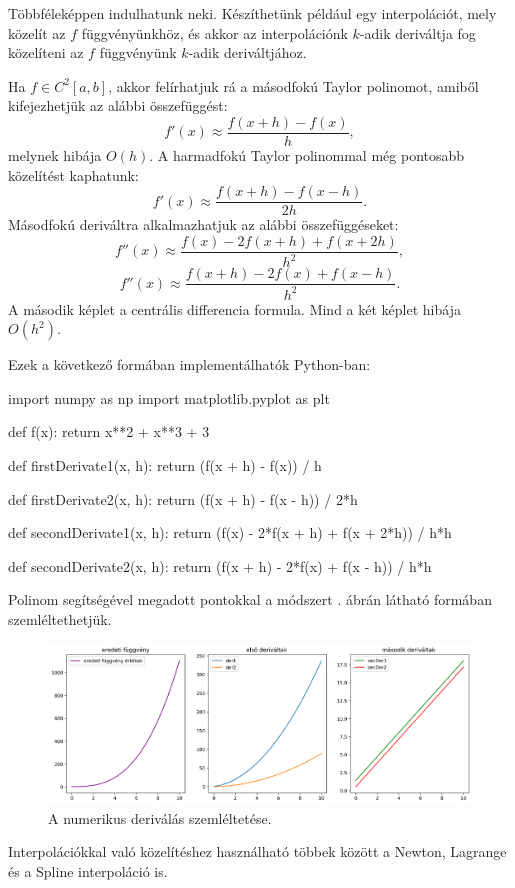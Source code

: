 Többféleképpen indulhatunk neki. Készíthetünk például egy interpolációt, mely
közelít az \(f\) függvényünkhöz, és akkor az interpolációnk \(k\)-adik
deriváltja fog közelíteni az \(f\) függvényünk \(k\)-adik
deriváltjához.

Ha \(f \in C^2[a,b]\), akkor felírhatjuk rá a másodfokú Taylor polinomot,
amiből kifejezhetjük az alábbi összefüggést:
\[
f'(x)\approx \frac{f(x+h)-f(x)}{h},
\]
melynek hibája \(O(h)\). A harmadfokú Taylor polinommal még pontosabb
közelítést kaphatunk:
\[
f'(x)\approx \frac{f(x+h)-f(x-h)}{2h}.
\]
Másodfokú deriváltra alkalmazhatjuk az alábbi összefüggéseket:
\[
f''(x)\approx \frac{f(x)-2f(x+h)+f(x+2h)}{h^2},
\]
\[
f''(x)\approx \frac{f(x+h)-2f(x)+f(x-h)}{h^2}.
\]
A második képlet a centrális differencia formula. Mind a két képlet
hibája \(O(h^2)\).

Ezek a következő formában implementálhatók Python-ban:
\begin{python}
import numpy as np
import matplotlib.pyplot as plt

def f(x):
    return x**2 + x**3 + 3

def firstDerivate1(x, h):
    return (f(x + h) - f(x)) / h

def firstDerivate2(x, h):
    return (f(x + h) - f(x - h)) / 2*h

def secondDerivate1(x, h):
    return (f(x) - 2*f(x + h) + f(x + 2*h)) / h*h

def secondDerivate2(x, h):
    return (f(x + h) - 2*f(x) + f(x - h)) / h*h
\end{python}
Polinom segítségével megadott pontokkal a módszert . ábrán látható formában szemléltethetjük.

\begin{figure}[h!]
\centering
\includegraphics[width=\textwidth]{img/deriv.png}
\caption{A numerikus deriválás szemléltetése.}
\label{fig:deriv}
\end{figure}
    
    Interpolációkkal való közelítéshez használható többek között a Newton, Lagrange és a
Spline interpoláció is.

